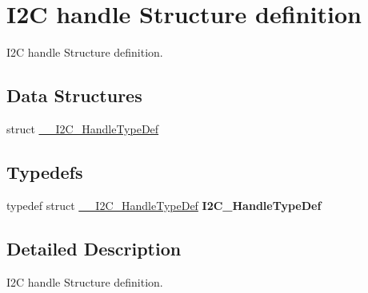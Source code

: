 \hypertarget{group___i2_c__handle___structure__definition}{}\section{I2C handle Structure definition}
\label{group___i2_c__handle___structure__definition}


I2C handle Structure definition.  


\subsection*{Data Structures}
\begin{DoxyCompactItemize}
\item 
struct \hyperlink{struct_____i2_c___handle_type_def}{\+\_\+\+\_\+\+I2\+C\+\_\+\+Handle\+Type\+Def}
\end{DoxyCompactItemize}
\subsection*{Typedefs}
\begin{DoxyCompactItemize}
\item 
\mbox{\label{group___i2_c__handle___structure__definition_ga31b88eb31a4622a50e34f02a1c3d516b}} 
typedef struct \hyperlink{struct_____i2_c___handle_type_def}{\+\_\+\+\_\+\+I2\+C\+\_\+\+Handle\+Type\+Def} {\bfseries I2\+C\+\_\+\+Handle\+Type\+Def}
\end{DoxyCompactItemize}


\subsection{Detailed Description}
I2C handle Structure definition. 

